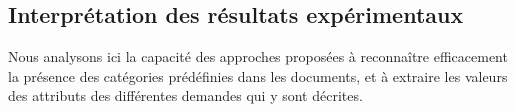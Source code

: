 %
%
%
%
%
%
%
%

\subsection{Interprétation des résultats expérimentaux}
Nous analysons ici la capacité des approches proposées à reconnaître efficacement la présence des catégories prédéfinies dans les documents, et à extraire les valeurs des attributs des différentes demandes qui y sont décrites. 


